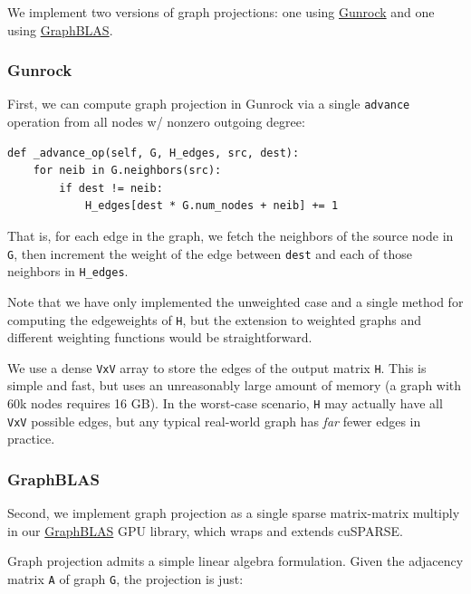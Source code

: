\documentclass[10pt,oneside]{memoir}
\begin{document}
We implement two versions of graph projections: one using
\href{https://github.com/gunrock/gunrock}{Gunrock} and one using
\href{https://github.com/owensgroup/GraphBLAS}{GraphBLAS}.

\hypertarget{gunrock}{%
\subsubsection{Gunrock}\label{gunrock}}

First, we can compute graph projection in Gunrock via a single
\texttt{advance} operation from all nodes w/ nonzero outgoing degree:

\begin{verbatim}
def _advance_op(self, G, H_edges, src, dest):
    for neib in G.neighbors(src):
        if dest != neib:
            H_edges[dest * G.num_nodes + neib] += 1
\end{verbatim}

That is, for each edge in the graph, we fetch the neighbors of the
source node in \texttt{G}, then increment the weight of the edge between
\texttt{dest} and each of those neighbors in \texttt{H\_edges}.

Note that we have only implemented the unweighted case and a single
method for computing the edgeweights of \texttt{H}, but the extension to
weighted graphs and different weighting functions would be
straightforward.

We use a dense \texttt{\textbar{}V\textbar{}x\textbar{}V\textbar{}}
array to store the edges of the output matrix \texttt{H}. This is simple
and fast, but uses an unreasonably large amount of memory (a graph with
60k nodes requires 16 GB). In the worst-case scenario, \texttt{H} may
actually have all \texttt{\textbar{}V\textbar{}x\textbar{}V\textbar{}}
possible edges, but any typical real-world graph has \emph{far} fewer
edges in practice.

\hypertarget{graphblas}{%
\subsubsection{GraphBLAS}\label{graphblas}}

Second, we implement graph projection as a single sparse matrix-matrix
multiply in our
\href{https://github.com/owensgroup/GraphBLAS}{GraphBLAS} GPU library,
which wraps and extends cuSPARSE.

Graph projection admits a simple linear algebra formulation. Given the
adjacency matrix \texttt{A} of graph \texttt{G}, the projection is just:
\end{document}
